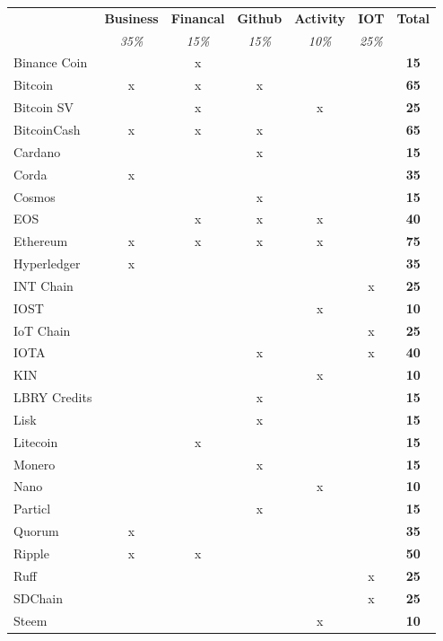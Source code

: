 \begin{table}[]
\begin{tabular}{@{}lcccccc@{}}
\toprule
\textbf{} & \textbf{Business} & \textbf{Financal} & \textbf{Github} & \textbf{Activity} & \textbf{IOT} & \textbf{Total} \\
\textit{} & \textit{35\%} & \textit{15\%} & \textit{15\%} & \textit{10\%} & \textit{25\%} & \textit{\textbf{}} \\ \midrule
Binance Coin &  & x &  &  &  & \textbf{15} \\
Bitcoin & x & x & x &  &  & \textbf{65} \\
Bitcoin SV &  & x &  & x &  & \textbf{25} \\
BitcoinCash & x & x & x &  &  & \textbf{65} \\
Cardano &  &  & x &  &  & \textbf{15} \\
Corda & x &  &  &  &  & \textbf{35} \\
Cosmos &  &  & x &  &  & \textbf{15} \\
EOS &  & x & x & x &  & \textbf{40} \\
Ethereum & x & x & x & x &  & \textbf{75} \\
Hyperledger & x &  &  &  &  & \textbf{35} \\
INT Chain &  &  &  &  & x & \textbf{25} \\
IOST &  &  &  & x &  & \textbf{10} \\
IoT Chain &  &  &  &  & x & \textbf{25} \\
IOTA &  &  & x &  & x & \textbf{40} \\
KIN &  &  &  & x &  & \textbf{10} \\
LBRY Credits &  &  & x &  &  & \textbf{15} \\
Lisk &  &  & x &  &  & \textbf{15} \\
Litecoin &  & x &  &  &  & \textbf{15} \\
Monero &  &  & x &  &  & \textbf{15} \\
Nano &  &  &  & x &  & \textbf{10} \\
Particl &  &  & x &  &  & \textbf{15} \\
Quorum & x &  &  &  &  & \textbf{35} \\
Ripple & x & x &  &  &  & \textbf{50} \\
Ruff &  &  &  &  & x & \textbf{25} \\
SDChain &  &  &  &  & x & \textbf{25} \\
Steem &  &  &  & x &  & \textbf{10} \\

\end{tabular}
\end{table}
